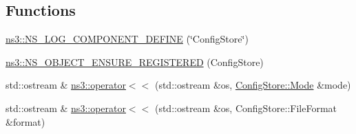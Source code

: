 \subsection*{Functions}
\begin{DoxyCompactItemize}
\item 
\hyperlink{namespacens3_a8b7a5fca6189bd2f51c9fdfe00dde343}{ns3\+::\+N\+S\+\_\+\+L\+O\+G\+\_\+\+C\+O\+M\+P\+O\+N\+E\+N\+T\+\_\+\+D\+E\+F\+I\+NE} (\char`\"{}Config\+Store\char`\"{})
\item 
\hyperlink{namespacens3_a74855952164dfc077e23d38f95598285}{ns3\+::\+N\+S\+\_\+\+O\+B\+J\+E\+C\+T\+\_\+\+E\+N\+S\+U\+R\+E\+\_\+\+R\+E\+G\+I\+S\+T\+E\+R\+ED} (Config\+Store)
\end{DoxyCompactItemize}
{\bf }\par
\begin{DoxyCompactItemize}
\item 
std\+::ostream \& \hyperlink{group__configstore_ga289c47e33b83129aced7736ba7c7960a}{ns3\+::operator$<$$<$} (std\+::ostream \&os, \hyperlink{lte__uplink__power__control_8m_a21de820aff859dc731034b432a16fa96}{Config\+Store\+::\+Mode} \&mode)
\item 
std\+::ostream \& \hyperlink{group__configstore_ga54d3ccba7f4a9b747b2d0c61b4e3db95}{ns3\+::operator$<$$<$} (std\+::ostream \&os, Config\+Store\+::\+File\+Format \&format)
\end{DoxyCompactItemize}

